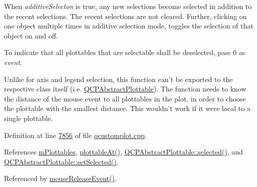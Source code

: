 When {\itshape additive\+Selecton} is true, any new selections become selected in addition to the recent selections. The recent selections are not cleared. Further, clicking on one object multiple times in additive selection mode, toggles the selection of that object on and off.

To indicate that all plottables that are selectable shall be deselected, pass 0 as {\itshape event}.

Unlike for axis and legend selection, this function can't be exported to the respective class itself (i.\+e. \hyperlink{a00024}{Q\+C\+P\+Abstract\+Plottable}). The function needs to know the distance of the mouse event to all plottables in the plot, in order to choose the plottable with the smallest distance. This wouldn't work if it were local to a single plottable. 

Definition at line \hyperlink{a00115_source_l07856}{7856} of file \hyperlink{a00115_source}{qcustomplot.\+cpp}.



References \hyperlink{a00116_source_l02115}{m\+Plottables}, \hyperlink{a00115_source_l06606}{plottable\+At()}, \hyperlink{a00116_source_l00378}{Q\+C\+P\+Abstract\+Plottable\+::selected()}, and \hyperlink{a00115_source_l08527}{Q\+C\+P\+Abstract\+Plottable\+::set\+Selected()}.



Referenced by \hyperlink{a00115_source_l07691}{mouse\+Release\+Event()}.


